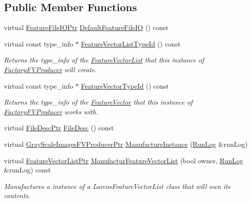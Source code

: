 \subsection*{Public Member Functions}
\begin{DoxyCompactItemize}
\item 
virtual \hyperlink{namespace_k_k_m_l_l_aa005d92db87866fad489feb5ff4b2dfa}{Feature\+File\+I\+O\+Ptr} \hyperlink{class_k_k_m_l_l_1_1_gray_scale_images_f_v_producer_factory_aaa0d8fc9be591a1a0882ced7a72b8991}{Default\+Feature\+File\+IO} () const 
\item 
virtual const type\+\_\+info $\ast$ \hyperlink{class_k_k_m_l_l_1_1_gray_scale_images_f_v_producer_factory_aab7b94d69c81f90a245d35955918a1c9}{Feature\+Vector\+List\+Type\+Id} () const 
\begin{DoxyCompactList}\small\item\em Returns the \textquotesingle{}type\+\_\+info\textquotesingle{} of the \hyperlink{class_k_k_m_l_l_1_1_feature_vector_list}{Feature\+Vector\+List} that this instance of \textquotesingle{}\hyperlink{class_k_k_m_l_l_1_1_factory_f_v_producer}{Factory\+F\+V\+Producer}\textquotesingle{} will create. \end{DoxyCompactList}\item 
virtual const type\+\_\+info $\ast$ \hyperlink{class_k_k_m_l_l_1_1_gray_scale_images_f_v_producer_factory_a3d37f5fb6bfee17c233e080a919b1ff3}{Feature\+Vector\+Type\+Id} () const 
\begin{DoxyCompactList}\small\item\em Returns the \textquotesingle{}type\+\_\+info\textquotesingle{} of the \hyperlink{class_k_k_m_l_l_1_1_feature_vector}{Feature\+Vector} that this instance of \textquotesingle{}\hyperlink{class_k_k_m_l_l_1_1_factory_f_v_producer}{Factory\+F\+V\+Producer}\textquotesingle{} works with. \end{DoxyCompactList}\item 
virtual \hyperlink{namespace_k_k_m_l_l_aa0d0b6ab4ec18868a399b8455b05d914}{File\+Desc\+Ptr} \hyperlink{class_k_k_m_l_l_1_1_gray_scale_images_f_v_producer_factory_a8a6cc390f3dad34892a3c8a46831b984}{File\+Desc} () const 
\item 
virtual \hyperlink{namespace_k_k_m_l_l_ad2e4f0192f9a3ac0841e33685bd4d5c6}{Gray\+Scale\+Images\+F\+V\+Producer\+Ptr} \hyperlink{class_k_k_m_l_l_1_1_gray_scale_images_f_v_producer_factory_a1750df4c07d26cc19f5a1e0fa2f8d332}{Manufacture\+Instance} (\hyperlink{class_k_k_b_1_1_run_log}{Run\+Log} \&run\+Log)
\item 
virtual \hyperlink{namespace_k_k_m_l_l_acf2ba92a3cf03e2b19674b24ff488ef6}{Feature\+Vector\+List\+Ptr} \hyperlink{class_k_k_m_l_l_1_1_gray_scale_images_f_v_producer_factory_af7224f69746a135f8ab1ddc2b8defe56}{Manufactur\+Feature\+Vector\+List} (bool owner, \hyperlink{class_k_k_b_1_1_run_log}{Run\+Log} \&run\+Log) const 
\begin{DoxyCompactList}\small\item\em Manufactures a instance of a \textquotesingle{}Larcos\+Feature\+Vector\+List\textquotesingle{} class that will own its contents. \end{DoxyCompactList}\end{DoxyCompactItemize}
